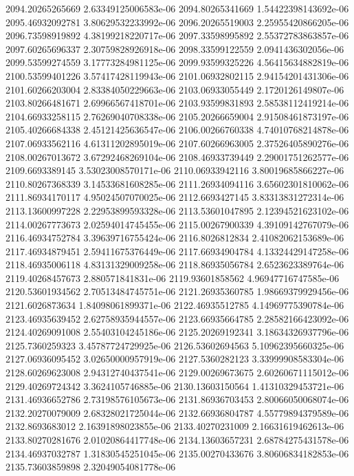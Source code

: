 {2094.20265265669 2.63349125006583e-06
2094.80265341669 1.54422398143692e-06
2095.46932092781 3.80629532233992e-06
2096.20265519003 2.25955420866205e-06
2096.73598919892 4.38199218220717e-06
2097.33598995892 2.55372783863857e-06
2097.60265696337 2.30759828926918e-06
2098.33599122559 2.0941436302056e-06
2099.53599274559 3.17773284981125e-06
2099.93599325226 4.56415634882819e-06
2100.53599401226 3.57417428119943e-06
2101.06932802115 2.94154201431306e-06
2101.60266203004 2.83384050229663e-06
2103.06933055449 2.1720126149807e-06
2103.80266481671 2.69966567418701e-06
2103.93599831893 2.58538112419214e-06
2104.66933258115 2.76269040708338e-06
2105.20266659004 2.91508461873197e-06
2105.40266684338 2.45121425636547e-06
2106.00266760338 4.74010768214878e-06
2107.06933562116 4.61311202895019e-06
2107.60266963005 2.37526405890276e-06
2108.00267013672 3.67292468269104e-06
2108.46933739449 2.29001751262577e-06
2109.6693389145 3.53023008570171e-06
2110.06933942116 3.80019685866227e-06
2110.80267368339 3.14533681608285e-06
2111.26934094116 3.65602301810062e-06
2111.86934170117 4.95024507070025e-06
2112.6693427145 3.83313831272314e-06
2113.13600997228 2.22953899593328e-06
2113.53601047895 2.12394521623102e-06
2114.00267773673 2.02594014745455e-06
2115.00267900339 4.39109142767079e-06
2116.46934752784 3.39639716755424e-06
2116.8026812834 2.41082062153689e-06
2117.46934879451 2.59411675376449e-06
2117.66934904784 4.13324429147258e-06
2118.46935006118 4.83131329009258e-06
2118.86935056784 2.6523623389764e-06
2119.40268457673 2.880571841831e-06
2119.93601858562 4.96947716747585e-06
2120.53601934562 2.70513484745751e-06
2121.26935360785 1.98669379929456e-06
2121.6026873634 1.84098061899371e-06
2122.46935512785 4.14969775390784e-06
2123.46935639452 2.62758935944557e-06
2123.66935664785 2.28582166423092e-06
2124.40269091008 2.55403104245186e-06
2125.20269192341 3.18634326937796e-06
2125.7360259323 3.45787724729925e-06
2126.53602694563 5.10962395660325e-06
2127.06936095452 3.02650000957919e-06
2127.5360282123 3.33999908583304e-06
2128.60269623008 2.94312740437541e-06
2129.00269673675 2.60260671115012e-06
2129.40269724342 3.3624105746885e-06
2130.13603150564 1.41310329453721e-06
2131.46936652786 2.73198576105673e-06
2131.86936703453 2.80066050068074e-06
2132.20270079009 2.68328021725044e-06
2132.66936804787 4.55779894379589e-06
2132.8693683012 2.16391898023855e-06
2133.40270231009 2.16631619462613e-06
2133.80270281676 2.01020864417748e-06
2134.13603657231 2.68784275431578e-06
2134.46937032787 1.31830545251045e-06
2135.00270433676 3.80606834182853e-06
2135.73603859898 2.32049054081778e-06
}
